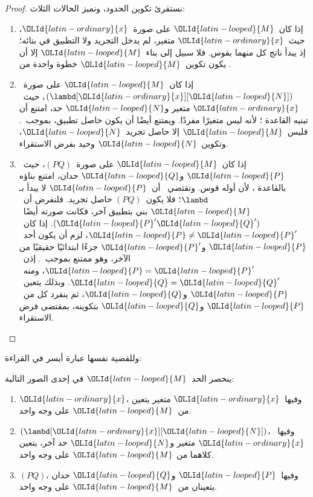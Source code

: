 \documentclass[../../../include/open-logic-section]{subfiles}
\begin{document}
\begin{proof}
  نستقرئ تكوين الحدود، ونميز الحالات الثلاث:
  \begin{enumerate}
    \item إذا كان~$\OLId{latin-looped}{M}$ على صورة~$\OLId{latin-ordinary}{x}$، حيث~$\OLId{latin-ordinary}{x}$ متغير،
      لم يدخل التجريد ولا التطبيق في بنائه؛ إذ يبدأ ناتج كل منهما بقوس.
      فلا سبيل إلى بناء~$\OLId{latin-looped}{M}$ إلا أن يكون تكوين~$\OLId{latin-looped}{M}$ خطوة واحدة من
      .
    \item إذا كان~$\OLId{latin-looped}{M}$ على صورة~$(\lambd[\OLId{latin-ordinary}{x}][\OLId{latin-looped}{N}])$، حيث~$\OLId{latin-ordinary}{x}$ متغير و$\OLId{latin-looped}{N}$ حد،
      امتنع أن تبنيه القاعدة
      ؛ لأنه ليس متغيرًا مفردًا.
      ويمتنع أيضًا أن يكون حاصل تطبيق، بموجب~.
      فليس~$\OLId{latin-looped}{M}$ إلا حاصل تجريد~$\OLId{latin-looped}{N}$، وتكوين~$\OLId{latin-looped}{N}$ وحيد بفرض الاستقراء.
    \item إذا كان~$\OLId{latin-looped}{M}$ على صورة~$(PQ)$، حيث~$\OLId{latin-looped}{P}$ و$\OLId{latin-looped}{Q}$ حدان،
      امتنع بناؤه بالقاعدة
      ، لأن أوله قوس.
      وتقتضي~ أن~$\OLId{latin-looped}{P}$ لا يبدأ بـ$\lambd$؛
      فلا يكون~$(PQ)$ حاصل تجريد. فلنفرض أن~$\OLId{latin-looped}{M}$ بني بتطبيق آخر،
      فكانت صورته أيضًا~$(\OLId{latin-looped}{P}'\OLId{latin-looped}{Q}')$. إذا كان~$\OLId{latin-looped}{P} \neq
      \OLId{latin-looped}{P}'$، لزم أن يكون أحد~$\OLId{latin-looped}{P}$ و$\OLId{latin-looped}{P}'$
      جزءًا ابتدائيًا حقيقيًا من الآخر، وهو ممتنع بموجب~.
      إذن~$\OLId{latin-looped}{P}=\OLId{latin-looped}{P}'$، ومنه~$\OLId{latin-looped}{Q}=\OLId{latin-looped}{Q}'$. وبذلك يتعين~$\OLId{latin-looped}{P}$ و$\OLId{latin-looped}{Q}$،
      ثم ينفرد كل من~$\OLId{latin-looped}{P}$ و$\OLId{latin-looped}{Q}$ بتكوينه، بمقتضى فرض الاستقراء.
  \end{enumerate}
\end{proof}

وللقضية نفسها عبارة أيسر في القراءة:
\begin{prop}
  ينحصر الحد~$\OLId{latin-looped}{M}$ في إحدى الصور التالية:
  \begin{enumerate}
    \item $\OLId{latin-ordinary}{x}$، وفيها~$\OLId{latin-ordinary}{x}$ متغير يتعين من~$\OLId{latin-looped}{M}$ على وجه واحد.
    \item $(\lambd[\OLId{latin-ordinary}{x}][\OLId{latin-looped}{N}])$، وفيها~$\OLId{latin-ordinary}{x}$ متغير و$\OLId{latin-looped}{N}$ حد آخر، يتعين كلاهما من
      $\OLId{latin-looped}{M}$ على وجه واحد.
    \item $(PQ)$، وفيها~$\OLId{latin-looped}{P}$ و$\OLId{latin-looped}{Q}$ حدان يتعينان من~$\OLId{latin-looped}{M}$ على وجه واحد.
  \end{enumerate}
\end{prop}
\end{document}
